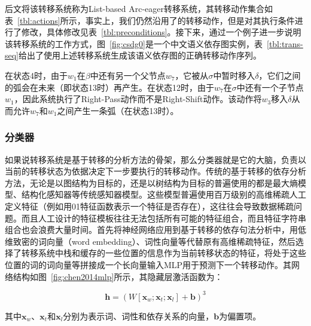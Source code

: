 后文将该转移系统称为List-based Arc-eager转移系统，其转移动作集合如表~\ref{tbl:actions}所示，事实上，我们仍然沿用了的转移动作，但是对其执行条件进行了修改，具体修改见表~\ref{tbl:preconditions}。接下来，通过一个例子进一步说明该转移系统的工作方式，图~\ref{fig:csdg0}是一个中文语义依存图实例，表~\ref{tbl:trans-seq}给出了使用上述转移系统生成该语义依存图的正确转移动作序列。

在状态4时，由于$w_1$在$\beta$中还有另一个父节点$w_7$，它被从$\sigma$中暂时移入$\delta$，它们之间的弧会在未来（即状态13时）再产生。在状态12时，由于$w_7$在$\sigma$中还有一个子节点$w_1$，因此系统执行了Right-Pass动作而不是Right-Shift动作。该动作将$w_3$移入$\delta$从而允许$w_7$和$w_1$之间产生一条弧（在状态13时）。

\subsubsection*{分类器}

如果说转移系统是基于转移的分析方法的骨架，那么分类器就是它的大脑，负责以当前的转移状态为依据决定下一步要执行的转移动作。传统的基于转移的依存分析方法，无论是以图结构为目标的，还是以树结构为目标的普遍使用的都是最大熵模型、结构化感知器等传统感知器模型。这些模型普遍使用百万级别的高维稀疏人工定义特征（例如用01特征函数表示一个特征是否存在），这往往会导致数据稀疏问题。而且人工设计的特征模板往往无法包括所有可能的特征组合，而且特征字符串组合也会浪费大量时间。首先将神经网络应用到基于转移的依存句法分析中，用低维致密的词向量（word embedding）、词性向量等代替原有高维稀疏特征，然后选择了转移系统中栈和缓存的一些位置的信息作为当前转移状态的特征，将处于这些位置的词的词向量等拼接成一个长向量输入MLP用于预测下一个转移动作。其网络结构如图~\ref{fig:chen2014mlp}所示，其隐藏层激活函数为：

\vspace{-0.6em}

\begin{equation}
\mathbf{h}=(W[\mathbf{x}_w;\mathbf{x}_t;\mathbf{x}_l ]+\mathbf{b})^3
\end{equation}

其中$\mathbf{x}_w$、$\mathbf{x}_t$和$\mathbf{x}_l$分别为表示词、词性和依存关系的向量，$\mathbf{b}$为偏置项。

